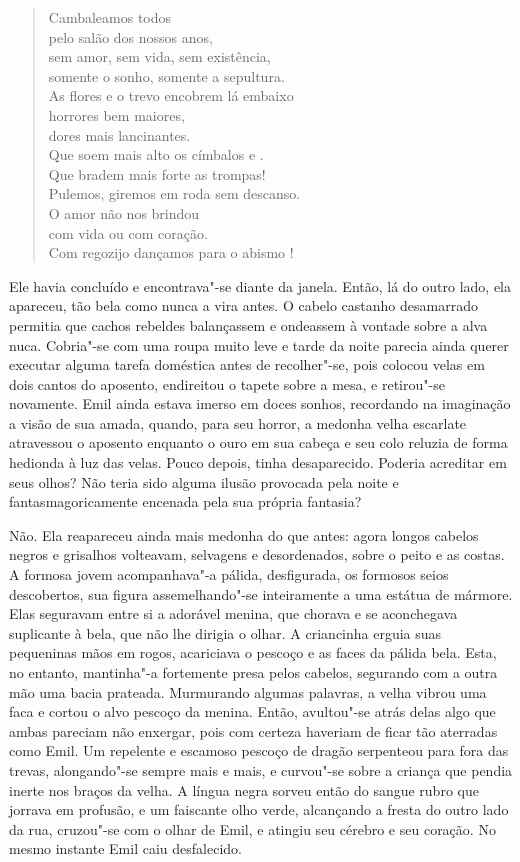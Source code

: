 \begin{verse}
Cambaleamos todos\\
pelo salão dos nossos anos,\\
sem amor, sem vida, sem existência,\\
somente o sonho, somente a sepultura.\\
As flores e o trevo encobrem lá embaixo\\ 
horrores bem maiores,\\
dores mais lancinantes.\\
Que soem mais alto os címbalos e .\\
Que bradem mais forte as trompas!\\
Pulemos, giremos em roda sem descanso.\\
O amor não nos brindou\\
com vida ou com coração.\\
Com regozijo dançamos para o abismo ! 
\end{verse}


Ele havia concluído e encontrava"-se diante da janela. Então, lá do outro
lado, ela apareceu, tão bela como nunca a vira antes. O cabelo castanho
desamarrado permitia que cachos rebeldes balançassem e ondeassem à
vontade sobre a alva nuca. Cobria"-se com uma roupa muito leve e tarde
da noite parecia ainda querer executar alguma tarefa doméstica antes de
recolher"-se, pois colocou velas em dois cantos do aposento, endireitou
o tapete sobre a mesa, e retirou"-se novamente. Emil ainda estava imerso
em doces sonhos, recordando na imaginação a visão de sua amada, quando,
para seu horror, a medonha velha escarlate atravessou o aposento
enquanto o ouro em sua cabeça e seu colo reluzia de forma hedionda à
luz das velas. Pouco depois, tinha desaparecido. Poderia acreditar em
seus olhos? Não teria sido alguma ilusão provocada pela noite e
fantasmagoricamente encenada pela sua própria fantasia?

Não. Ela reapareceu ainda mais medonha do que antes: agora longos
cabelos negros e grisalhos volteavam, selvagens e desordenados, sobre o
peito e as costas. A formosa jovem acompanhava"-a pálida, desfigurada,
os formosos seios descobertos, sua figura assemelhando"-se inteiramente
a uma estátua de mármore. Elas seguravam entre si a adorável menina,
que chorava e se aconchegava suplicante à bela, que não lhe dirigia o
olhar. A criancinha erguia suas pequeninas mãos em rogos, acariciava o
pescoço e as faces da pálida bela. Esta, no entanto, mantinha"-a
fortemente presa pelos cabelos, segurando com a outra mão uma bacia
prateada. Murmurando algumas palavras, a velha vibrou uma faca e cortou
o alvo pescoço da menina. Então, avultou"-se atrás delas algo que ambas
pareciam não enxergar, pois com certeza haveriam de ficar tão aterradas
como Emil. Um repelente e escamoso pescoço de dragão serpenteou para
fora das trevas, alongando"-se sempre mais e mais, e curvou"-se sobre a
criança que pendia inerte nos braços da velha. A língua negra sorveu
então do sangue rubro que jorrava em profusão, e um faiscante olho
verde, alcançando a fresta do outro lado da rua, cruzou"-se com o olhar
de Emil, e atingiu seu cérebro e seu coração. No mesmo instante Emil
caiu desfalecido.

